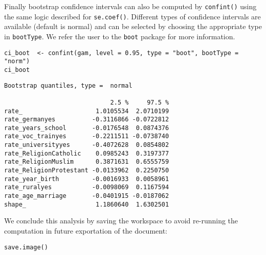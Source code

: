 \documentclass[a4paper,twoside,11pt]{article}
\begin{document}
Finally bootstrap confidence intervals can also be computed by \texttt{confint()}
using the same logic described for \texttt{se.coef()}. Different types of
confidence intervals are available (default is normal) and can be selected by
choosing the appropriate type in \texttt{bootType}. We refer the user to the \texttt{boot}
package \citep{boot2017} for more information.
\begin{verbatim}
ci_boot  <- confint(gam, level = 0.95, type = "boot", bootType = "norm")
ci_boot
\end{verbatim}

\begin{verbatim}
Bootstrap quantiles, type =  normal 

                             2.5 %     97.5 %
rate_                    1.0105534  2.0710199
rate_germanyes          -0.3116866 -0.0722812
rate_years_school       -0.0176548  0.0874376
rate_voc_trainyes       -0.2211511 -0.0738740
rate_universityyes      -0.4072628  0.0854802
rate_ReligionCatholic    0.0985243  0.3197377
rate_ReligionMuslim      0.3871631  0.6555759
rate_ReligionProtestant -0.0133962  0.2250750
rate_year_birth         -0.0016933  0.0058961
rate_ruralyes           -0.0098069  0.1167594
rate_age_marriage       -0.0401915 -0.0187062
shape_                   1.1860640  1.6302501
\end{verbatim}

\label{sec:org32ad181}
We conclude this analysis by saving the workspace to avoid re-running the
computation in future exportation of the document:
\begin{verbatim}
save.image()
\end{verbatim}

\label{sec:org8402f9f}


\end{document}
